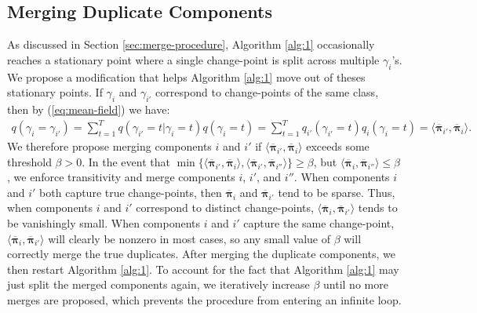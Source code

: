 \subsection{Merging Duplicate Components}
\label{app:merge-procedure}

As discussed in Section \ref{sec:merge-procedure}, Algorithm \ref{alg:1} occasionally reaches a stationary point where a single change-point is split across multiple $\gamma_i$'s. We propose a modification that helps Algorithm \ref{alg:1} move out of theses stationary points. If $\gamma_i$ and $\gamma_{i'}$ correspond to change-points of the same class, then by (\ref{eq:mean-field}) we have:
\begin{align}
    q(\gamma_i = \gamma_{i'}) = \sum_{t=1}^T q(\gamma_{i'} = t | \gamma_i = t ) q(\gamma_i = t) = \sum_{t=1}^T q_{i'}(\gamma_{i'} = t)q_i(\gamma_i = t) = \langle\overline{\boldsymbol{\pi}}_{i'}, \overline{\boldsymbol{\pi}}_i \rangle.
\end{align}
We therefore propose merging components $i$ and $i'$ if $\langle\overline{\boldsymbol{\pi}}_{i'}, \overline{\boldsymbol{\pi}}_i \rangle$ exceeds some threshold $\beta > 0$. In the event that $\min\{\langle\overline{\boldsymbol{\pi}}_{i'}, \overline{\boldsymbol{\pi}}_i \rangle,\langle\overline{\boldsymbol{\pi}}_{i'}, \overline{\boldsymbol{\pi}}_{i''} \rangle\} \geq \beta$, but $\langle\overline{\boldsymbol{\pi}}_{i}, \overline{\boldsymbol{\pi}}_{i''} \rangle \leq \beta$, we enforce transitivity and merge components $i$, $i'$, and $i''$. When components $i$ and $i'$ both capture true change-points, then $\overline{\boldsymbol{\pi}}_{i}$ and $\overline{\boldsymbol{\pi}}_{i'}$ tend to be sparse. Thus, when components $i$ and $i'$ correspond to distinct change-points, $\langle\overline{\boldsymbol{\pi}}_{i}, \overline{\boldsymbol{\pi}}_{i'} \rangle$ tends to be vanishingly small. When components $i$ and $i'$ capture the same change-point, $\langle\overline{\boldsymbol{\pi}}_{i}, \overline{\boldsymbol{\pi}}_{i'}\rangle$ will clearly be nonzero in most cases, so any small value of $\beta$ will correctly merge the true duplicates. After merging the duplicate components, we then restart Algorithm \ref{alg:1}. To account for the fact that Algorithm \ref{alg:1} may just split the merged components again, we iteratively increase $\beta$ until no more merges are proposed, which prevents the procedure from entering an infinite loop. 


